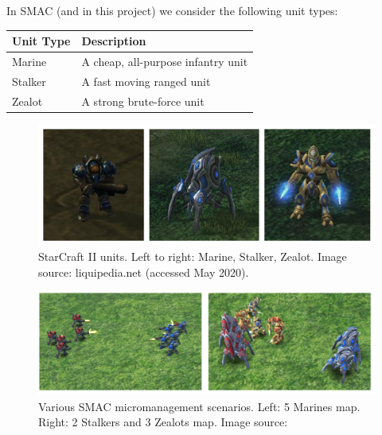 In SMAC (and in this project) we consider the following unit types:

\vspace{3mm}
\begin{center}
\begin{tabular}{ |p{2.5cm}||p{6.6cm}|  }
 \hline
 \centering Unit Type& \centering Description \tabularnewline
 \hline
 \centering Marine   & A cheap, all-purpose infantry unit\tabularnewline
 \hline
 \centering Stalker   & A fast moving ranged unit\tabularnewline
 \hline
 \centering Zealot   &  A strong brute-force unit\tabularnewline
 \hline
 
\end{tabular}
\end{center}
\vspace{3mm}



\begin{figure}
    \centering
    \hbox{\hspace{3.2em}\includegraphics[scale = 0.5]{images/better.png}}
    \caption{StarCraft II units. Left to right: Marine, Stalker, Zealot. Image source: liquipedia.net (accessed May 2020).}
\end{figure}

\begin{figure}
    \centering
    \hbox{\hspace{-0.7em}\includegraphics[scale = 0.35]{images/5mand2s3z.png}}
    \caption{Various SMAC micromanagement scenarios. Left: 5 Marines map. Right: 2 Stalkers and 3 Zealots map. Image source: \cite{qmixcite}}
\end{figure}

